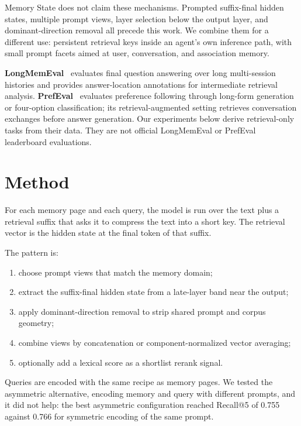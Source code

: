 \documentclass[
  10pt,
  letterpaper,
]{article}
\providecommand{\tightlist}{%
  \setlength{\itemsep}{0pt}\setlength{\parskip}{0pt}}
\begin{document}
Memory State does not claim these mechanisms. Prompted suffix-final
hidden states, multiple prompt views, layer selection below the output
layer, and dominant-direction removal all precede this work. We combine
them for a different use: persistent retrieval keys inside an agent's
own inference path, with small prompt facets aimed at user, conversation,
and association memory.

\textbf{LongMemEval}~\cite{wu2024} evaluates final question answering over
long multi-session histories and provides answer-location annotations
for intermediate retrieval analysis. \textbf{PrefEval}~\cite{zhao2025}
evaluates preference following through long-form generation or
four-option classification; its retrieval-augmented setting retrieves
conversation exchanges before answer generation. Our experiments below
derive retrieval-only tasks from their data. They are not official
LongMemEval or PrefEval leaderboard evaluations.

\section{Method}\label{method}

For each memory page and each query, the model is run over the text plus
a retrieval suffix that asks it to compress the text into a short key.
The retrieval vector is the hidden state at the final token of that
suffix.

The pattern is:

\begin{enumerate}
\def\labelenumi{\arabic{enumi}.}
\tightlist
\item
  choose prompt views that match the memory domain;
\item
  extract the suffix-final hidden state from a late-layer band near the
  output;
\item
  apply dominant-direction removal to strip shared prompt and corpus
  geometry;
\item
  combine views by concatenation or component-normalized vector
  averaging;
\item
  optionally add a lexical score as a shortlist rerank signal.
\end{enumerate}

Queries are encoded with the same recipe as memory pages. We tested the
asymmetric alternative, encoding memory and query with different
prompts, and it did not help: the best asymmetric configuration reached
Recall@5 of 0.755 against 0.766 for symmetric encoding of the same
prompt.
\end{document}

